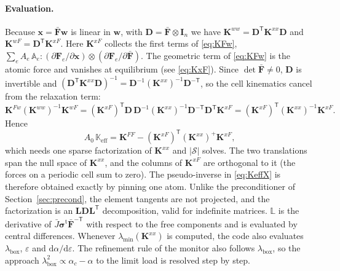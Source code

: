 \documentclass[11pt,a4paper]{article}
\newcommand{\Fb}{\bar{\mathbf F}}
\newcommand{\sigt}{\bm\sigma^{\mathrm t}}
\newcommand{\F}{\mathbf F}
\newcommand{\I}{\mathbf I}
\newcommand{\x}{\mathbf x}
\newcommand{\w}{\mathbf w}
\begin{document}
\paragraph{Evaluation.}
Because \(\x=\Fb\w\) is linear in \(\w\), with \(\mathbf D=\Fb\otimes\I_n\) we have
\(\mathbf K^{ww}=\mathbf D^{\mathsf T}\mathbf K^{xx}\mathbf D\) and
\(\mathbf K^{wF}=\mathbf D^{\mathsf T}\mathbf K^{xF}\). Here \(\mathbf K^{xF}\) collects the first terms of
\eqref{eq:KFw}, \(\sum_eA_e\,\mathbb A_e:(\partial\F_e/\partial\x)\otimes(\partial\F_e/\partial\Fb)\). The
geometric term of \eqref{eq:KFw} is the atomic force and vanishes at equilibrium (see
\eqref{eq:KxF}). Since \(\det\Fb\neq0\), \(\mathbf D\) is invertible and
\((\mathbf D^{\mathsf T}\mathbf K^{xx}\mathbf D)^{-1}=\mathbf D^{-1}(\mathbf K^{xx})^{-1}\mathbf D^{-\mathsf T}\), so the
cell kinematics cancel from the relaxation term:
\[
  \mathbf K^{Fw}(\mathbf K^{ww})^{-1}\mathbf K^{wF}
  =(\mathbf K^{xF})^{\mathsf T}\mathbf D\,\mathbf D^{-1}(\mathbf K^{xx})^{-1}\mathbf D^{-\mathsf T}\mathbf D^{\mathsf T}\mathbf K^{xF}
  =(\mathbf K^{xF})^{\mathsf T}(\mathbf K^{xx})^{-1}\mathbf K^{xF}.
\]
Hence
\begin{equation}
  A_0\,\mathbb K_{\mathrm{eff}}=\mathbf K^{FF}-(\mathbf K^{xF})^{\mathsf T}(\mathbf K^{xx})^{+}\mathbf K^{xF},
  \label{eq:KeffX}
\end{equation}
which needs one sparse factorization of \(\mathbf K^{xx}\) and \(|\mathcal S|\) solves. The two
translations span the null space of \(\mathbf K^{xx}\), and the columns of \(\mathbf K^{xF}\) are
orthogonal to it (the forces on a periodic cell sum to zero). The pseudo-inverse in
\eqref{eq:KeffX} is therefore obtained exactly by pinning one atom. Unlike the preconditioner of
Section~\ref{sec:precond}, the element tangents are not projected, and the factorization is an
\(\mathbf L\mathbf D\mathbf L^{\mathsf T}\) decomposition, valid for indefinite matrices. \(\mathbb L\) is
the derivative of \(\bar J\sigt\Fb^{-\mathsf T}\) with respect to the free components and is evaluated
by central differences. Whenever \(\lambda_{\min}(\mathbf K^{xx})\) is computed, the code also
evaluates \(\lambda_{\mathrm{box}}\), \(\varepsilon\) and \(\mathrm d\alpha/\mathrm d\varepsilon\). The
refinement rule of the monitor also follows \(\lambda_{\mathrm{box}}\), so the approach
\(\lambda_{\mathrm{box}}^2\propto\alpha_c-\alpha\) to the limit load is resolved step by step.
\end{document}
